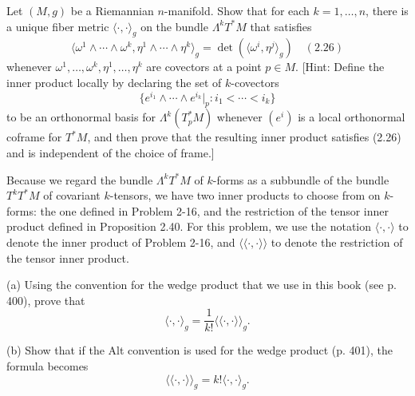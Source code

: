 \begin{exercise}
\label{prob:fiber-metric-exterior-powers}
\leanok
{}
Let $(M, g)$ be a Riemannian $n$-manifold. Show that for each $k = 1, \ldots, n$, there is a unique fiber metric $\langle \cdot, \cdot \rangle_g$ on the bundle $\Lambda^k T^* M$ that satisfies
\[
\langle \omega^1 \wedge \cdots \wedge \omega^k, \eta^1 \wedge \cdots \wedge \eta^k \rangle_g = \det\left(\langle \omega^i, \eta^j \rangle_g\right) \quad (2.26)
\]
whenever $\omega^1, \ldots, \omega^k, \eta^1, \ldots, \eta^k$ are covectors at a point $p \in M$. [Hint: Define the inner product locally by declaring the set of $k$-covectors
\[
\{e^{i_1} \wedge \cdots \wedge e^{i_k} |_p : i_1 < \cdots < i_k\}
\]
to be an orthonormal basis for $\Lambda^k(T_p^* M)$ whenever $(e^i)$ is a local orthonormal coframe for $T^* M$, and then prove that the resulting inner product satisfies (2.26) and is independent of the choice of frame.]
\end{exercise}

\begin{exercise}
\label{prob:inner-products-k-forms}
Because we regard the bundle $\Lambda^k T^* M$ of $k$-forms as a subbundle of the bundle $T^k T^* M$ of covariant $k$-tensors, we have two inner products to choose from on $k$-forms: the one defined in Problem 2-16, and the restriction of the tensor inner product defined in Proposition 2.40. For this problem, we use the notation $\langle \cdot, \cdot \rangle$ to denote the inner product of Problem 2-16, and $\langle\langle \cdot, \cdot \rangle\rangle$ to denote the restriction of the tensor inner product.

(a) Using the convention for the wedge product that we use in this book (see p. 400), prove that
\[
\langle \cdot, \cdot \rangle_g = \frac{1}{k!} \langle\langle \cdot, \cdot \rangle\rangle_g.
\]

(b) Show that if the Alt convention is used for the wedge product (p. 401), the formula becomes
\[
\langle\langle \cdot, \cdot \rangle\rangle_g = k! \langle \cdot, \cdot \rangle_g.
\]
\end{exercise}

